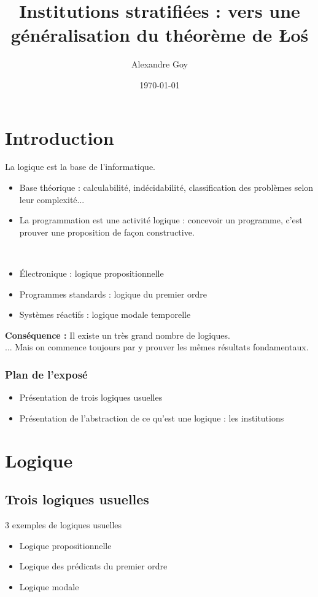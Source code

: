 \documentclass{beamer}
\title[Morpho-logique]{Institutions stratifiées : vers une généralisation du théorème de \L o\'s}
\author{Alexandre Goy}
\institute[Parcours MP]
{
CentraleSupélec, Parcours Maths-Physique
}
\date{\today}
\newcommand{\itemz}{\item[$\triangleright$]}
\begin{document}
\begin{frame}
\titlepage
\end{frame}

\section*{Introduction}

\begin{frame}
La logique est la base de l'informatique.
\begin{itemize}
\itemz Base théorique : calculabilité, indécidabilité, classification des problèmes selon leur complexité...
\itemz La programmation est une activité logique : concevoir un programme, c'est prouver une proposition de façon constructive.
\end{itemize}
\pause ~\\
\begin{itemize}
\itemz \'Electronique : logique propositionnelle
\itemz Programmes standards : logique du premier ordre
\itemz Systèmes réactifs : logique modale temporelle
\end{itemize} \pause 
\textbf{Conséquence :} Il existe un très grand nombre de logiques.\pause \\
... Mais on commence toujours par y prouver les mêmes résultats fondamentaux.

\end{frame}

\begin{frame}
\frametitle{Plan de l'exposé}
\begin{itemize}
\itemz Présentation de trois logiques usuelles
\itemz Présentation de l'abstraction de ce qu'est une logique : les institutions \cite{Dia08}
\end{itemize}
\end{frame}

\section{Logique}

\subsection{Trois logiques usuelles}

\begin{frame}
3 exemples de logiques usuelles
\begin{itemize}
\itemz Logique propositionnelle
\itemz Logique des prédicats du premier ordre
\itemz Logique modale
\end{itemize}
\end{frame}
\end{document}
